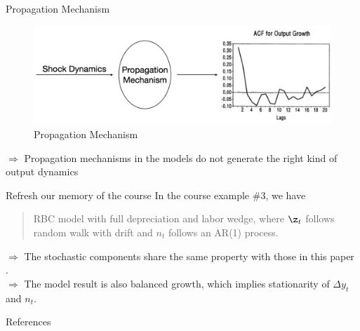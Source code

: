 \documentclass[10pt]{beamer}
\begin{document}
\begin{frame}{Propagation Mechanism}
    \begin{figure}
        \centering
        \includegraphics[width=\linewidth]{figures/propagation.png}
        \caption{Propagation Mechanism}
    \end{figure}

    $\Rightarrow$ Propagation mechanisms in the models do not generate the right kind of output dynamics
\end{frame}

\begin{frame}{Refresh our memory of the course}
In the course example \#3, we have 
    \begin{quote}
        RBC model with full depreciation and labor wedge, where $\z_t$ follows random walk with drift and $n_t$ follows an AR(1) process. 
    \end{quote}
        $\Longrightarrow$ The stochastic components share the same property with those in this paper \cite{cogley_nason_1995}.\\
        $\Longrightarrow$ The model result is also balanced growth, which implies stationarity of $\Delta y_t$ and $n_t$.

\end{frame}

\begin{frame}[allowframebreaks]{References}

    
    

\end{frame}
\end{document}
